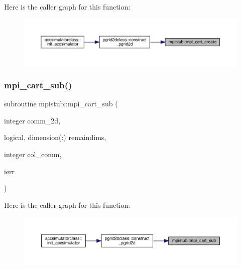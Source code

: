 Here is the caller graph for this function\+:\nopagebreak
\begin{figure}[H]
\begin{center}
\leavevmode
\includegraphics[width=350pt]{namespacempistub_ae0b8402fe840a321a5e4eabbda8ecb43_icgraph}
\end{center}
\end{figure}
\mbox{\label{namespacempistub_ab9ac48f74bbcdf05669e63852a220c09}} 
\subsubsection{\texorpdfstring{mpi\_cart\_sub()}{mpi\_cart\_sub()}}
{\footnotesize\ttfamily subroutine mpistub\+::mpi\+\_\+cart\+\_\+sub (\begin{DoxyParamCaption}\item[{integer}]{comm\+\_\+2d,  }\item[{logical, dimension(\+:)}]{remaindims,  }\item[{integer}]{col\+\_\+comm,  }\item[{}]{ierr }\end{DoxyParamCaption})}

Here is the caller graph for this function\+:\nopagebreak
\begin{figure}[H]
\begin{center}
\leavevmode
\includegraphics[width=350pt]{namespacempistub_ab9ac48f74bbcdf05669e63852a220c09_icgraph}
\end{center}
\end{figure}
\mbox{\label{namespacempistub_a3085e38e0e5d38df633afc7b2d92cebb}} 

